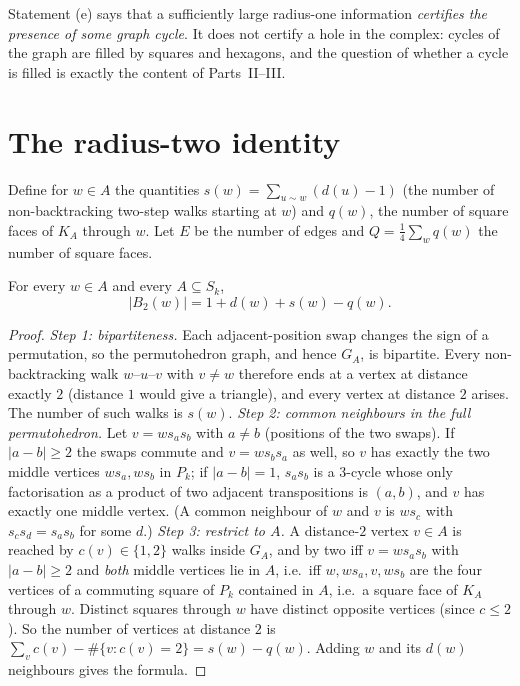 \begin{remark}
Statement (e) says that a sufficiently large radius-one information \emph{certifies the presence of some graph cycle}. It does not certify a hole in the complex: cycles of the graph are filled by squares and hexagons, and the question of whether a cycle is filled is exactly the content of Parts~II--III.
\end{remark}

\section{The radius-two identity}\label{sec:radius2}
Define for $w\in A$ the quantities $s(w)=\sum_{u\sim w}(d(u)-1)$ (the number of non-backtracking two-step walks starting at $w$) and $q(w)$, the number of square faces of $K_A$ through $w$. Let $E$ be the number of edges and $Q=\tfrac14\sum_wq(w)$ the number of square faces.
\begin{theorem}\label{thm:radius2}
For every $w\in A$ and every $A\subseteq S_k$,
\[
|B_2(w)|=1+d(w)+s(w)-q(w).
\]
\end{theorem}
\begin{proof}
\emph{Step 1: bipartiteness.} Each adjacent-position swap changes the sign of a permutation, so the permutohedron graph, and hence $G_A$, is bipartite. Every non-backtracking walk $w$--$u$--$v$ with $v\ne w$ therefore ends at a vertex at distance exactly $2$ (distance $1$ would give a triangle), and every vertex at distance $2$ arises. The number of such walks is $s(w)$.
\emph{Step 2: common neighbours in the full permutohedron.} Let $v=ws_as_b$ with $a\ne b$ (positions of the two swaps). If $|a-b|\ge2$ the swaps commute and $v=ws_bs_a$ as well, so $v$ has exactly the two middle vertices $ws_a,ws_b$ in $P_k$; if $|a-b|=1$, $s_as_b$ is a $3$-cycle whose only factorisation as a product of two adjacent transpositions is $(a,b)$, and $v$ has exactly one middle vertex. (A common neighbour of $w$ and $v$ is $ws_c$ with $s_cs_d=s_as_b$ for some $d$.)
\emph{Step 3: restrict to $A$.} A distance-$2$ vertex $v\in A$ is reached by $c(v)\in\{1,2\}$ walks inside $G_A$, and by two iff $v=ws_as_b$ with $|a-b|\ge2$ and \emph{both} middle vertices lie in $A$, i.e.\ iff $w,ws_a,v,ws_b$ are the four vertices of a commuting square of $P_k$ contained in $A$, i.e.\ a square face of $K_A$ through $w$. Distinct squares through $w$ have distinct opposite vertices (since $c\le2$). So the number of vertices at distance $2$ is $\sum_vc(v)-\#\{v:c(v)=2\}=s(w)-q(w)$. Adding $w$ and its $d(w)$ neighbours gives the formula.
\end{proof}
